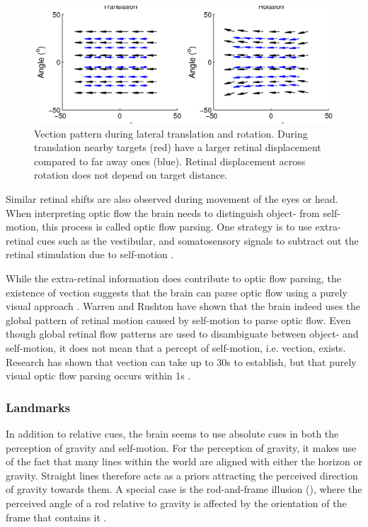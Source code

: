 \begin{figure}
    \includegraphics[width=1.0\textwidth]{src/intro/figures/optic_flow.eps}

    \caption{Vection pattern during  lateral translation and  rotation. During translation nearby targets (red) have a larger retinal displacement compared to far away ones (blue). Retinal displacement across rotation does not depend on target distance. }
    \label{intro:fig2}
\end{figure}

Similar retinal shifts are also observed during movement of the eyes or head. When interpreting optic flow the brain needs to distinguish object- from self-motion, this process is called optic flow parsing. One strategy is to use extra-retinal cues such as the vestibular, and somatosensory signals to subtract out the retinal stimulation due to self-motion \cite{wertheim1994,wexler2001,macneilage2012}.

While the extra-retinal information does contribute to optic flow parsing, the existence of vection \cite{dichgans1978} suggests that the brain can parse optic flow using a purely visual approach \cite{rushton2005,warren2007}. Warren and Rushton \citeyear{warren2009} have shown that the brain indeed uses the global pattern of retinal motion caused by self-motion to parse optic flow. Even though global retinal flow patterns are used to disambiguate between object- and self-motion, it does not mean that a percept of self-motion, i.e. vection, exists. Research has shown that vection can take up to 30s to establish, but that purely visual optic flow parsing occurs within 1s \cite{warren2009}.

\subsubsection{Landmarks}
In addition to relative cues, the brain seems to use absolute cues in both the perception of gravity and self-motion. For the perception of gravity, it makes use of the fact that many lines within the world are aligned with either the horizon or gravity. Straight lines therefore acts as a priors attracting the perceived direction of gravity towards them. A special case is the rod-and-frame illusion (), where the perceived angle of a rod relative to gravity is affected by the orientation of the frame that contains it \cite{witkin1948}. 

